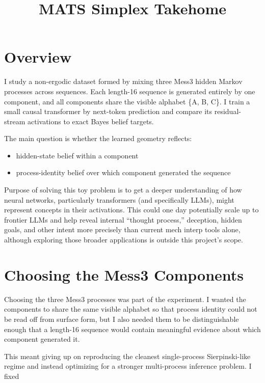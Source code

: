 \documentclass[11pt]{article}
\title{MATS Simplex Takehome}
\author{}
\date{}
\begin{document}
\maketitle

\section{Overview}

I study a non-ergodic dataset formed by mixing three Mess3 hidden Markov processes across sequences. Each length-16 sequence is generated entirely by one component, and all components share the visible alphabet \{A, B, C\}. I train a small causal transformer by next-token prediction and compare its residual-stream activations to exact Bayes belief targets.

The main question is whether the learned geometry reflects:

\begin{itemize}
  \item hidden-state belief within a component
  \item process-identity belief over which component generated the sequence
\end{itemize}

Purpose of solving this toy problem is to get a deeper understanding of how neural networks, particularly transformers (and specifically LLMs), might represent concepts in their activations. This could one day potentially scale up to frontier LLMs and help reveal internal ``thought process,'' deception, hidden goals, and other intent more precisely than current mech interp tools alone, although exploring those broader applications is outside this project's scope.

\section{Choosing the Mess3 Components}

Choosing the three Mess3 processes was part of the experiment. I wanted the components to share the same visible alphabet so that process identity could not be read off from surface form, but I also needed them to be distinguishable enough that a length-16 sequence would contain meaningful evidence about which component generated it.

This meant giving up on reproducing the cleanest single-process Sierpinski-like regime and instead optimizing for a stronger multi-process inference problem. I fixed
\end{document}
